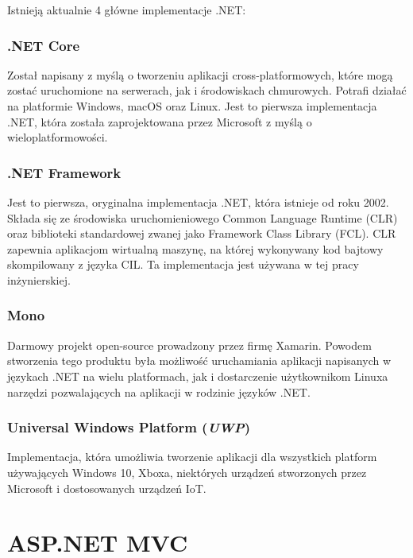 Istnieją aktualnie 4 główne implementacje .NET:

\subsection{.NET Core}
Został napisany z myślą o tworzeniu aplikacji cross-platformowych, które mogą zostać uruchomione na serwerach, jak i środowiskach chmurowych. Potrafi działać na platformie Windows, macOS oraz Linux. Jest to pierwsza implementacja .NET, która została zaprojektowana przez Microsoft z myślą o wieloplatformowości.

\subsection{.NET Framework}
Jest to pierwsza, oryginalna implementacja .NET, która istnieje od roku 2002. Składa się ze środowiska uruchomieniowego Common Language Runtime (CLR) oraz biblioteki standardowej zwanej jako Framework Class Library (FCL). CLR zapewnia aplikacjom wirtualną maszynę, na której wykonywany kod bajtowy skompilowany z języka CIL. Ta implementacja jest używana w tej pracy inżynierskiej.

\subsection{Mono}
Darmowy projekt open-source prowadzony przez firmę Xamarin. Powodem stworzenia tego produktu była możliwość uruchamiania aplikacji napisanych w językach .NET na wielu platformach, jak i dostarczenie użytkownikom Linuxa narzędzi pozwalających na aplikacji w rodzinie języków .NET.
\subsection{Universal Windows Platform (\textit{UWP})}
Implementacja, która umożliwia tworzenie aplikacji dla wszystkich platform używających Windows 10, Xboxa, niektórych urządzeń stworzonych przez Microsoft i dostosowanych urządzeń IoT.

{\let\cleardoublepage\relax \chapter{ASP.NET MVC}}
\label{cha:wstep}

